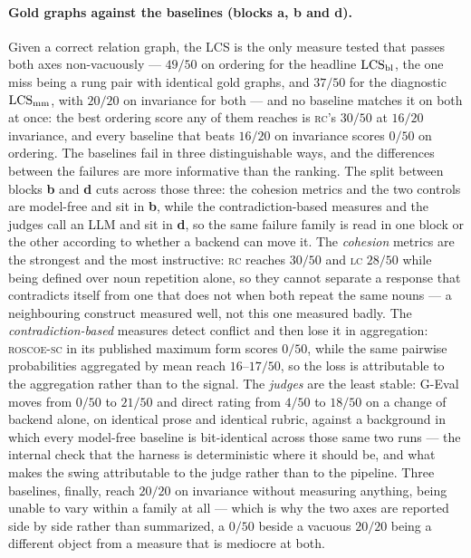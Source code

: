 \paragraph{Gold graphs against the baselines (blocks \textbf{a}, \textbf{b} and \textbf{d}).} Given a correct relation
graph, the LCS is the only measure tested that passes both axes non-vacuously --- $49/50$ on ordering for the
headline $\mathrm{LCS}_{\mathrm{bl}}$, the one miss being a rung pair with identical gold graphs, and $37/50$ for the diagnostic
$\mathrm{LCS}_{\mathrm{mm}}$, with $20/20$ on invariance for both --- and no baseline matches it on both at once: the best ordering score any of them
reaches is \textsc{rc}'s $30/50$ at $16/20$ invariance, and every baseline that beats $16/20$ on invariance
scores $0/50$ on ordering. The baselines fail in three distinguishable ways, and the differences between the
failures are more informative than the ranking. The split between blocks \textbf{b} and \textbf{d} cuts across
those three: the cohesion metrics and the two controls are model-free and sit in \textbf{b}, while the
contradiction-based measures and the judges call an LLM and sit in \textbf{d}, so the same failure family is
read in one block or the other according to whether a backend can move it. The \emph{cohesion} metrics are the
strongest and the most instructive:
\textsc{rc} reaches $30/50$ and \textsc{lc} $28/50$ while being defined over noun repetition alone, so they
cannot separate a response that contradicts itself from one that does not when both repeat the same nouns ---
a neighbouring construct measured well, not this one measured badly. The \emph{contradiction-based} measures
detect conflict and then lose it in aggregation: \textsc{roscoe-sc} in its published maximum form scores
$0/50$, while the same pairwise probabilities aggregated by mean reach $16$--$17/50$, so the loss is
attributable to the aggregation rather than to the signal. The \emph{judges} are the least stable: G-Eval
moves from $0/50$ to $21/50$ and direct rating from $4/50$ to $18/50$ on a change of backend alone, on
identical prose and identical rubric, against a background in which every model-free baseline is
bit-identical across those same two runs --- the internal check that the harness is deterministic where it
should be, and what makes the swing attributable to the judge rather than to the pipeline. Three baselines,
finally, reach $20/20$ on invariance without measuring anything, being unable to vary within a family at all
--- which is why the two axes are reported side by side rather than summarized, a $0/50$ beside a vacuous
$20/20$ being a different object from a measure that is mediocre at both.

